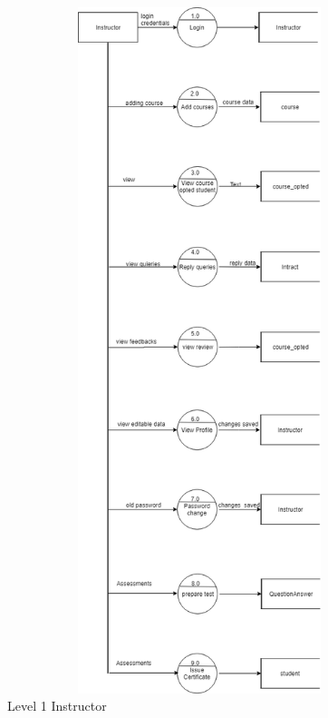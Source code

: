 \begin{figure}
  \includegraphics[height=20cm,width=12cm]{dfdlevel1Instructor.png}
  \caption{ Level 1 Instructor}
  \label{fig1:Data Flow Diagram Level 1 : Instructor}
\end{figure}

